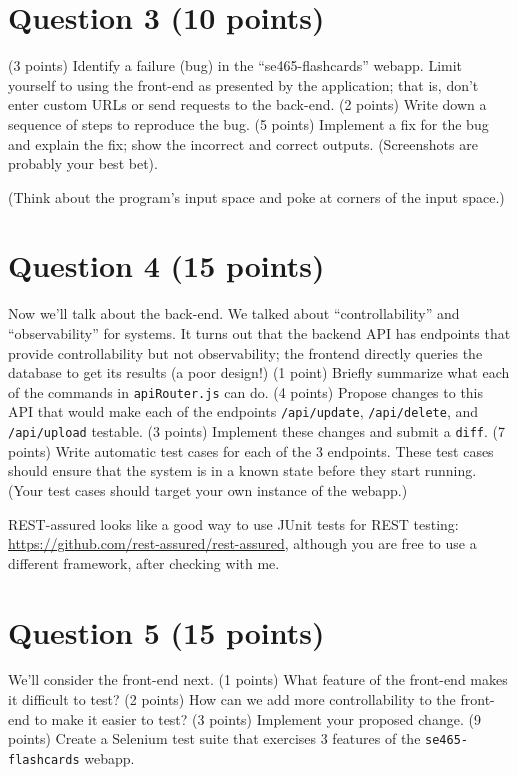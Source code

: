 \documentclass[10pt,hidelinks]{article}
\begin{document}
\section*{Question 3 (10 points)}
(3 points) Identify a failure (bug) in the ``se465-flashcards'' webapp.
Limit yourself to using the front-end as presented by the application; that is,
don't enter custom URLs or send requests to the back-end.
(2 points) Write down a sequence of
steps to reproduce the bug. (5 points) Implement a fix for the bug and explain the
fix; show the incorrect and correct outputs. (Screenshots are probably
your best bet).

(Think about the program's input space and poke at corners of the
input space.)

\section*{Question 4 (15 points)}
Now we'll talk about the back-end. We talked about ``controllability''
and ``observability'' for systems.  It turns out that the backend API
has endpoints that provide controllability but not observability; the
frontend directly queries the database to get its results (a poor
design!)  (1 point) Briefly summarize what each of the commands in
{\tt apiRouter.js} can do. (4 points) Propose changes to this API that
would make each of the endpoints {\tt /api/update}, {\tt /api/delete},
and {\tt /api/upload} testable. (3 points) Implement these changes and
submit a {\tt diff}.
(7 points) Write automatic test cases for each of the 3 endpoints.
These test cases should ensure that the system is in a known state
before they start running. (Your test cases should target your own instance
of the webapp.)

REST-assured looks like a good way to use JUnit tests for REST
testing: \url{https://github.com/rest-assured/rest-assured}, although
you are free to use a different framework, after checking with me.

\section*{Question 5 (15 points)}
We'll consider the front-end next. (1 points) What feature of the front-end
makes it difficult to test? (2 points) How can we add more controllability
to the front-end to make it easier to test? (3 points) Implement your proposed
change. (9 points) Create a Selenium test suite that exercises 3 features of the
{\tt se465-flashcards} webapp.
\end{document}
